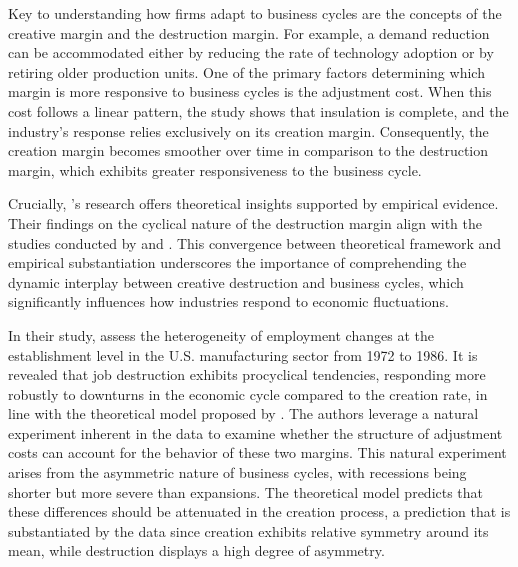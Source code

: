 Key to understanding how firms adapt to business cycles are the concepts of the creative margin and the destruction
margin. For example, a demand reduction can be accommodated either by reducing the rate of technology adoption or by
retiring older production units. One of the primary factors determining which margin is more responsive to business
cycles is the adjustment cost. When this cost follows a linear pattern, the study shows that insulation is complete, and
the industry's response relies exclusively on its creation margin. Consequently, the creation margin becomes smoother
over time in comparison to the destruction margin, which exhibits greater responsiveness to the business cycle.
\par

Crucially, \cite{CabHarm94}'s research offers theoretical insights supported by empirical evidence. Their findings on
the cyclical nature of the destruction margin align with the studies conducted by \cite{BlaDia90} and \cite{DavHalt92}.
This convergence between theoretical framework and empirical substantiation underscores the importance of comprehending
the dynamic interplay between creative destruction and business cycles, which significantly influences how industries
respond to economic fluctuations.
\par

In their study, \cite{DavHalt92} assess the heterogeneity of employment changes at the establishment level in the U.S.
manufacturing sector from 1972 to 1986. It is revealed that job destruction exhibits procyclical tendencies, responding
more robustly to downturns in the economic cycle compared to the creation rate, in line with the theoretical model
proposed by \cite{CabHarm94}. The authors leverage a natural experiment inherent in the data to examine whether the
structure of adjustment costs can account for the behavior of these two margins. This natural experiment arises from the
asymmetric nature of business cycles, with recessions being shorter but more severe than expansions. The theoretical
model predicts that these differences should be attenuated in the creation process, a prediction that is substantiated
by the data since creation exhibits relative symmetry around its mean, while destruction displays a high degree of
asymmetry.
\par

